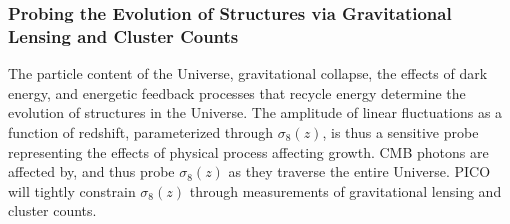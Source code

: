 \documentclass[PICOReport.tex]{subfiles}
\begin{document}
\subsubsection{Probing the Evolution of Structures via Gravitational Lensing and Cluster Counts} 
\label{sec:gravitationallensing}

The particle content of the Universe, gravitational collapse, the effects of dark energy, and energetic feedback processes that recycle energy determine the evolution of structures in the Universe. The amplitude of linear fluctuations as a function of redshift, parameterized through $\sigma_8(z)$, is thus a sensitive probe representing the effects of physical process affecting growth. \ac{CMB} photons are affected by, and thus probe $\sigma_{8}(z)$ as they traverse the entire Universe. PICO will tightly constrain $\sigma_8(z)$ through measurements of gravitational lensing and cluster counts. 
\end{document}
